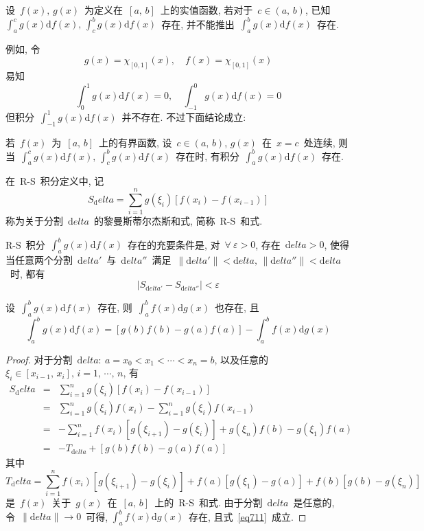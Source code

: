 \begin{Remark}
设~$f(x),\,g(x)$~为定义在~$[a,\,b]$~上的实值函数, 若对于~$c \in (a,\,b)$, 已知~$\int_a^c g(x) \mathrm{d} f(x), \, \int_c^b g(x) \mathrm{d} f(x)$~存在, 并不能推出~$\int_a^b g(x) \mathrm{d} f(x)$~存在.

例如, 令
\[
g(x)=\chi_{[0,1]}(x), \quad f(x)= \chi_{[0,1]}(x)
\]
易知
\[
\int_0^1 g(x) \mathrm{d} f(x) = 0, \quad \int_{-1}^0 g(x) \mathrm{d} f(x) = 0
\]
但积分~$\int_{-1}^1 g(x) \mathrm{d} f(x)$~并不存在. 不过下面结论成立:

\smallskip

若~$f(x)$~为~$[a,\,b]$~上的有界函数, 设~$c \in (a,\,b)$, $g(x)$~在~$x=c$~处连续, 则当~$\int_a^c g(x) \mathrm{d} f(x), \, \int_c^b g(x) \mathrm{d} f(x)$~存在时, 有积分~$\int_a^b g(x) \mathrm{d} f(x)$~存在.
\end{Remark}

在~R-S~积分定义中, 记
\[
S_\mathrm{d}elta = \sum_{i=1}^n g(\xi_i)[f(x_i)-f(x_{i-1})]
\]
称为关于分割~$\mathrm{d}elta$~的黎曼\raisebox{0.5mm}{--}斯蒂尔杰斯和式, 简称~R-S~和式.

\begin{Theorem} \label{thm711}
R-S~积分~$\int_a^b g(x) \mathrm{d} f(x)$~存在的充要条件是, 对~$\forall~\varepsilon > 0$, 存在~$\mathrm{d}elta > 0$, 使得当任意两个分割~$\mathrm{d}elta'$~与~$\mathrm{d}elta''$~满足~$\|\mathrm{d}elta'\|<\mathrm{d}elta,\,\|\mathrm{d}elta''\|<\mathrm{d}elta$~时, 都有
\[
|S_{\mathrm{d}elta'} - S_{\mathrm{d}elta''}| < \varepsilon
\]
\end{Theorem}

\begin{Theorem}
设~$\int_a^b g(x) \mathrm{d} f(x)$~存在, 则~$\int_a^b f(x) \mathrm{d} g(x)$~也存在, 且
\begin{equation} \label{eq711}
\int_a^b g(x) \mathrm{d} f(x) = [g(b)f(b)-g(a)f(a)]-\int_a^b f(x) \mathrm{d} g(x)
\end{equation}
\end{Theorem}

\begin{proof}
对于分割~$\mathrm{d}elta:\: a=x_0 < x_1 <\cdots < x_n =b$, 以及任意的~$\xi_i \in [x_{i-1},\,x_i], \, i=1,\,\cdots,\,n$, 有
\begin{eqnarray*}
S_\mathrm{d}elta &=& \sum_{i=1}^n g(\xi_i)[f(x_i)-f(x_{i-1})] \\
&=& \sum_{i=1}^n g(\xi_i)f(x_i) - \sum_{i=1}^n g(\xi_i)f(x_{i-1}) \\
&=& - \sum_{i=1}^n f(x_i) [g(\xi_{i+1})-g(\xi_i)] + g(\xi_n)f(b)-g(\xi_1)f(a) \\
&=& -T_{\mathrm{d}elta} + [g(b)f(b)-g(a)f(a)]
\end{eqnarray*}
其中
\[
T_\mathrm{d}elta=\sum_{i=1}^n f(x_i) [g(\xi_{i+1})-g(\xi_i)]+f(a)[g(\xi_1)-g(a)]+f(b)[g(b)-g(\xi_n)]
\]
是~$f(x)$~关于~$g(x)$~在~$[a,\,b]$~上的~R-S~和式. 由于分割~$\mathrm{d}elta$~是任意的, 令~$\|\mathrm{d}elta\| \to 0$~可得, $\int_a^b f(x) \mathrm{d} g(x)$~存在, 且式~\eqref{eq711}~成立.
\end{proof}

